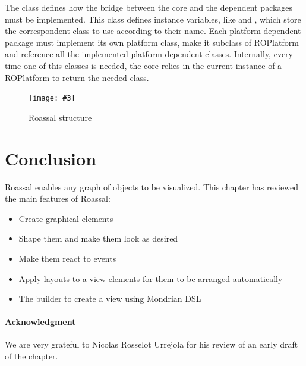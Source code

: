 \documentclass[a4paper,10pt,twoside]{book}
\newcommand{\fig}[4]{
		\begin{figure}[#1]
			\centering
			\texttt{[image: \#3]}
			\caption{\label{fig:#3}#4}
		\end{figure}}
\begin{document}
The  class defines how the bridge between the core and the dependent packages must be implemented. This class defines instance variables, like  and , which store the correspondent class to use according to their name. Each platform dependent package must implement its own platform class, make it subclass of ROPlatform and reference all the implemented platform dependent classes.
Internally, every time one of this classes is needed, the core relies in the current instance of a ROPlatform to return the needed class.

\fig{H}{0.3}{structure}{Roassal structure}



\section{Conclusion}

Roassal enables any graph of objects to be visualized. This chapter has reviewed the main features of Roassal:

\begin{itemize}
\item Create graphical elements
\item Shape them and make them look as desired
\item Make them react to events
\item Apply layouts to a view elements for them to be arranged automatically 
\item The builder to create a view using Mondrian DSL
\end{itemize}

\paragraph{Acknowledgment}
We are very grateful to Nicolas Rosselot Urrejola for his review of an early draft of the chapter.

%
%


\ifx\wholebook\relax\else
   
   
\end{document}

